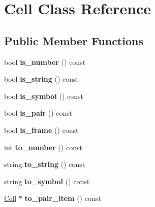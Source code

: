 \hypertarget{classCell}{\section{Cell Class Reference}
\label{classCell}
}
\subsection*{Public Member Functions}
\begin{DoxyCompactItemize}
\item 
\hypertarget{classCell_a3fc98c5b17b5136698f0d6cc5098d0b1}{bool {\bfseries is\-\_\-number} () const }\label{classCell_a3fc98c5b17b5136698f0d6cc5098d0b1}

\item 
\hypertarget{classCell_a2fa7c6bc8f1aaeea708987a458ee757d}{bool {\bfseries is\-\_\-string} () const }\label{classCell_a2fa7c6bc8f1aaeea708987a458ee757d}

\item 
\hypertarget{classCell_af65cb6ebca6eb0cdae92b94c6c9170eb}{bool {\bfseries is\-\_\-symbol} () const }\label{classCell_af65cb6ebca6eb0cdae92b94c6c9170eb}

\item 
\hypertarget{classCell_ad35f994b709c6f2d39c28d37ea531b5e}{bool {\bfseries is\-\_\-pair} () const }\label{classCell_ad35f994b709c6f2d39c28d37ea531b5e}

\item 
\hypertarget{classCell_aec416c3fd3e42f3f1561f0e4925ef079}{bool {\bfseries is\-\_\-frame} () const }\label{classCell_aec416c3fd3e42f3f1561f0e4925ef079}

\item 
\hypertarget{classCell_a5feb82baf94f9ea40ab379ff40252057}{int {\bfseries to\-\_\-number} () const }\label{classCell_a5feb82baf94f9ea40ab379ff40252057}

\item 
\hypertarget{classCell_a07fffa139d78f90330cff5d2dec873a0}{string {\bfseries to\-\_\-string} () const }\label{classCell_a07fffa139d78f90330cff5d2dec873a0}

\item 
\hypertarget{classCell_a2b0c83446d5395274acd34bb1d749898}{string {\bfseries to\-\_\-symbol} () const }\label{classCell_a2b0c83446d5395274acd34bb1d749898}

\item 
\hypertarget{classCell_a28333096120ab2ee55f6b5349be1df3e}{\hyperlink{classCell}{Cell} $\ast$ {\bfseries to\-\_\-pair\-\_\-item} () const }\label{classCell_a28333096120ab2ee55f6b5349be1df3e}


\end{DoxyCompactItemize}
